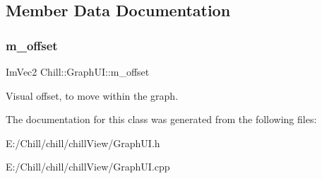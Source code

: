 \subsection{Member Data Documentation}
\mbox{\label{class_chill_1_1_graph_u_i_a923428629a957d077fedc0ccd83b4cb1}} 
\subsubsection{\texorpdfstring{m\+\_\+offset}{m\_offset}}
{\footnotesize\ttfamily Im\+Vec2 Chill\+::\+Graph\+U\+I\+::m\+\_\+offset}

Visual offset, to move within the graph. 

The documentation for this class was generated from the following files\+:\begin{DoxyCompactItemize}
\item 
E\+:/\+Chill/chill/chill\+View/Graph\+U\+I.\+h\item 
E\+:/\+Chill/chill/chill\+View/Graph\+U\+I.\+cpp\end{DoxyCompactItemize}
